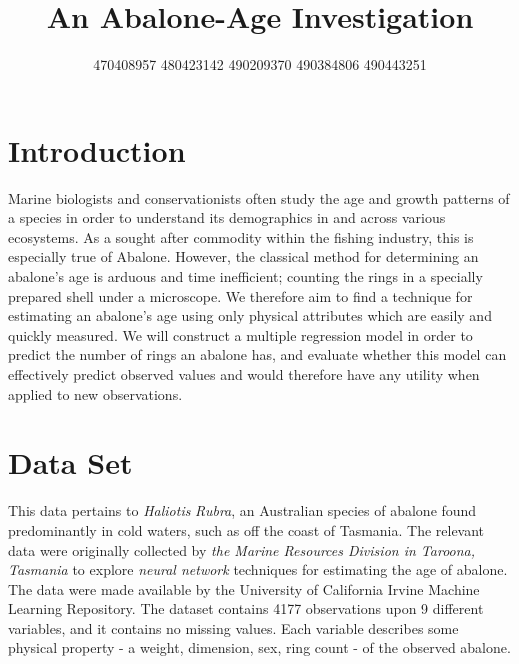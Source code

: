 \documentclass[letterpaper,9pt,twocolumn,twoside,]{pinp}
\title{An Abalone-Age Investigation}
\author[]{\textbar{} 470408957 \textbar{} 480423142 \textbar{} 490209370
\textbar{} 490384806 \textbar{} 490443251 \textbar{}}
\begin{document}
\verticaladjustment{-2pt}

\maketitle
\thispagestyle{firststyle}



\hypertarget{introduction}{%
\section{Introduction}\label{introduction}}

Marine biologists and conservationists often study the age and growth
patterns of a species in order to understand its demographics in and
across various ecosystems. As a sought after commodity within the
fishing industry, this is especially true of Abalone. However, the
classical method for determining an abalone's age is arduous and time
inefficient; counting the rings in a specially prepared shell under a
microscope. We therefore aim to find a technique for estimating an
abalone's age using only physical attributes which are easily and
quickly measured. We will construct a multiple regression model in order
to predict the number of rings an abalone has, and evaluate whether this
model can effectively predict observed values and would therefore have
any utility when applied to new observations.

\hypertarget{data-set}{%
\section{Data Set}\label{data-set}}

This data pertains to \emph{Haliotis} \emph{Rubra}, an Australian
species of abalone found predominantly in cold waters, such as off the
coast of Tasmania. The relevant data were originally collected by
\emph{the Marine Resources Division in Taroona, Tasmania} to explore
\emph{neural network} techniques for estimating the age of abalone. The
data were made available by the University of California Irvine Machine
Learning Repository. The dataset contains 4177 observations upon 9
different variables, and it contains no missing values. Each variable
describes some physical property - a weight, dimension, sex, ring count
- of the observed abalone.
\end{document}
